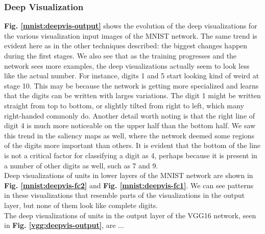 \begin{comment}
The visualizations show the pattern in the visualization image that was responsible for eliciting activations in the specific feature map. This pattern can reveal what a certain part of the network finds important and what it is looking for in an image. The tools of the figures are linked together similar to the saliency map figures. Additionally, if you click the save tool, all of the deconvolutional visualizations will be downloaded.
\end{comment}

\subsubsection{Deep Visualization}

\textbf{Fig. \ref{mnist:deepvis-output}} shows the evolution of the deep visualizations for the various visualization input images of the MNIST network. The same trend is evident here as in the other techniques described: the biggest changes happen during the first stages. We also see that as the training progresses and the network sees more examples, the deep visualizations actually seem to look less like the actual number. For instance, digits 1 and 5 start looking kind of weird at stage 10. This may be because the network is getting more specialized and learns that the digits can be written with larges variations. The digit 1 might be written straight from top to bottom, or slightly tilted from right to left, which many right-handed commonly do. Another detail worth noting is that the right line of digit 4 is much more noticeable on the upper half than the bottom half. We saw this trend in the saliency maps as well, where the network deemed some regions of the digits more important than others. It is evident that the bottom of the line is not a critical factor for classifying a digit as 4, perhaps because it is present in a number of other digits as well, such as 7 and 9.\\

\noindent Deep visualizations of units in lower layers of the MNIST network are shown in \textbf{Fig. \ref{mnist:deepvis-fc2}} and \textbf{Fig. \ref{mnist:deepvis-fc1}}. We can see patterns in these visualizations that resemble parts of the visualizations in the output layer, but none of them look like complete digits. \\


\noindent The deep visualizations of units in the output layer of the VGG16 network, seen in \textbf{Fig. \ref{vgg:deepvis-output}}, are ...

